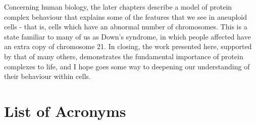 \documentclass[a4paper,11pt,twoside,openright]{scrbook}
\begin{document}
Concerning human biology, the later chapters describe a model of protein complex
behaviour that explains some of the features that we see in aneuploid cells -
that is, cells which have an abnormal number of chromosomes. This is a state
familiar to many of us as Down's syndrome, in which people affected have an
extra copy of chromosome 21. In closing, the work presented here, supported by
that of many others, demonstrates the fundamental importance of protein
complexes to life, and I hope goes some way to deepening our understanding of
their behaviour within cells.

\clearpage
\tableofcontents
{}

\clearpage
\listoffigures
{}

\clearpage
\listoftables
{}
\clearpage

\chapter*{List of Acronyms}
\end{document}
